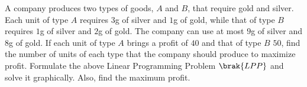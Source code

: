 \item A company produces two types of goods, $A$ and $B$, that require gold and silver. Each unit of type $A$ requires $3$g of silver and $1$g of gold, while that of type $B$ requires $1$g of silver and $2$g of gold. The company can use at most $9$g of silver and $8$g of gold. If each unit of type $A$ brings a profit of \rupee $40$ and that of type $B$ \rupee $50$, find the number of units of each type that the company should produce to maximize profit. Formulate the above Linear Programming Problem $\brak{LPP}$ and solve it graphically. Also, find the maximum profit.

